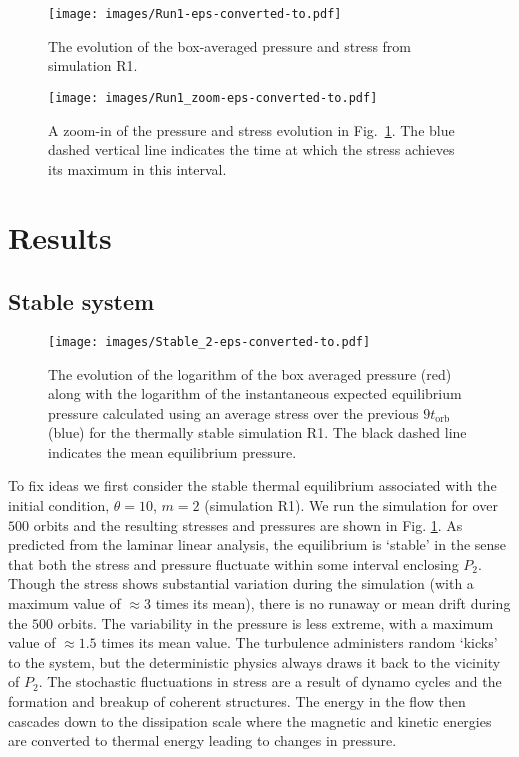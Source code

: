 \documentclass[useAMS]{mn2e}
\begin{document}
\begin{figure}
\texttt{[image: images/Run1-eps-converted-to.pdf]}
\caption{The evolution of the box-averaged pressure and stress from simulation R1.}
\label{Fig::r1_p}
\end{figure}



\begin{figure}
\texttt{[image: images/Run1\_zoom-eps-converted-to.pdf]}
\caption{A zoom-in of the pressure and stress evolution in
  Fig.~\ref{Fig::r1_p}. 
 The blue dashed vertical line indicates the time at which the stress
 achieves its maximum in this interval.}
\label{Fig::R1_P_Z}
\end{figure}

\section{Results}

\subsection{Stable system}

\begin{figure}
\texttt{[image: images/Stable\_2-eps-converted-to.pdf]}
\caption{The evolution of the logarithm of the box averaged pressure (red) along with the logarithm of the instantaneous expected equilibrium pressure calculated using an average stress over the previous $9t_{\text{orb}}$ (blue) for the thermally stable simulation R1. The black dashed line indicates the mean equilibrium pressure.  }
\label{fig::r1_pexp}
\end{figure}

To fix ideas we first consider the stable thermal equilibrium
associated with the initial condition, $\theta=10$, $m=2$ (simulation R1).
We run the simulation for over $500$ orbits and the resulting stresses
and pressures are shown in Fig. \ref{Fig::r1_p}. As predicted from
the laminar
linear analysis, the equilibrium is `stable' in the sense that both
the stress and pressure fluctuate within some interval enclosing 
$P_{2}$.
Though the stress shows substantial variation during the simulation (with a
maximum value of $\approx3$ times its mean), there is no runaway or
mean drift during the $500$ orbits. The variability in the pressure is
less extreme, with a maximum value of $\approx 1.5$ times its
mean value. 
 The turbulence administers
random `kicks' to the system, but the deterministic physics always 
draws it back to the vicinity of $P_2$. 
The stochastic fluctuations in stress are a result of
dynamo cycles and the formation and breakup of coherent
structures. The energy in the flow then cascades down to the
dissipation scale where the magnetic and kinetic energies are
converted to thermal energy leading to changes in  pressure. 
\end{document}
